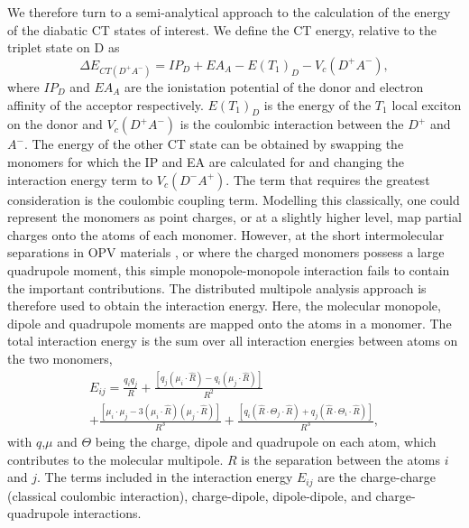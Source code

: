 \documentclass[aps,physrev,reprint,superscriptaddress,nofootinbib,amsmath,amssymb,a4paper]{revtex4-2}
\begin{document}
We therefore turn to a semi-analytical approach to the calculation of the energy of the diabatic CT states of interest. We define the CT energy, relative to the triplet state on D as 
\begin{equation}
    \Delta E_{CT(D^+A^-)} = IP_D +EA_A  - E(T_1)_D -V_c(D^+A^-), 
\end{equation}
 where $IP_D$ and $EA_A$ are the ionistation potential of the donor and electron affinity of the acceptor respectively. $E(T_1)_D$ is the energy of the $T_1$ local exciton on the donor and $V_c(D^+A^-)$ is the coulombic interaction between the $D^+$ and $A^-$. The energy of the other CT state can be obtained by swapping the monomers for which the IP and EA are calculated for and changing the interaction energy term to $V_c(D^-A^+)$. The term that requires the greatest consideration is the coulombic coupling term. Modelling this classically, one could represent the monomers as point charges, or at a slightly higher level, map partial charges onto the atoms of each monomer. However, at the short intermolecular separations in OPV materials \cite{Schwarze2019,Luke2022}, or where the charged monomers possess a large quadrupole moment, this simple monopole-monopole interaction fails to contain the important contributions. The distributed multipole analysis approach \cite{Stone1985, Stone1981} is therefore used to obtain the interaction energy. Here, the molecular monopole, dipole and quadrupole moments are mapped onto the atoms in a monomer. The total interaction energy is the sum over all interaction energies between atoms on the two monomers,
\begin{multline}
    E_{ij} = \frac{q_iq_j}{R} + \frac{[q_j(\mu_i\cdot\hat{R})-q_i(\mu_j\cdot\hat{R})]}{R^2}\\+\frac{[\mu_i \cdot \mu_j − 3 (\mu_i \cdot \hat{R})(\mu_j \cdot \hat{R})]}{R^3}  + \frac{[ q_i (\hat{R} \cdot \Theta_j \cdot \hat{R}) + q_j (\hat{R} \cdot \Theta_i · \hat{R}) ] }{R^3}, 
\end{multline}
with $q$,$\mu$ and $\Theta$ being the charge, dipole and quadrupole on each atom, which contributes to the molecular multipole. $R$ is the separation between the atoms $i$ and $j$. The terms included in the interaction energy $E_{ij}$ are the charge-charge (classical coulombic interaction), charge-dipole, dipole-dipole, and charge-quadrupole interactions.
\end{document}
